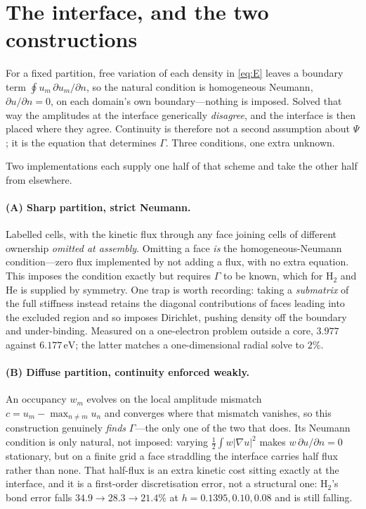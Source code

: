 \documentclass[11pt,a4paper]{article}
\begin{document}
\section{The interface, and the two constructions}

For a fixed partition, free variation of each density in \eqref{eq:E} leaves a boundary term
$\oint u_m \,\partial u_m/\partial n$, so the natural condition is homogeneous Neumann,
$\partial u/\partial n = 0$, on each domain's own boundary---nothing is imposed. Solved that way the
amplitudes at the interface generically \emph{disagree}, and the interface is then placed where they
agree. Continuity is therefore not a second assumption about $\Psi$; it is the equation that
determines $\Gamma$. Three conditions, one extra unknown.

Two implementations each supply one half of that scheme and take the other half from elsewhere.

\paragraph{(A) Sharp partition, strict Neumann.} Labelled cells, with the kinetic flux through any
face joining cells of different ownership \emph{omitted at assembly}. Omitting a face \emph{is} the
homogeneous-Neumann condition---zero flux implemented by not adding a flux, with no extra equation.
This imposes the condition exactly but requires $\Gamma$ to be known, which for H$_2$ and He is
supplied by symmetry. One trap is worth recording: taking a \emph{submatrix} of the full stiffness
instead retains the diagonal contributions of faces leading into the excluded region and so imposes
Dirichlet, pushing density off the boundary and under-binding. Measured on a one-electron problem
outside a core, $3.977$ against $6.177\,\mathrm{eV}$; the latter matches a one-dimensional radial
solve to $2\%$.

\paragraph{(B) Diffuse partition, continuity enforced weakly.} An occupancy $w_m$ evolves on the
local amplitude mismatch $c = u_m - \max_{n\neq m} u_n$ and converges where that mismatch vanishes,
so this construction genuinely \emph{finds} $\Gamma$---the only one of the two that does. Its
Neumann condition is only natural, not imposed: varying $\tfrac12\int w|\nabla u|^2$ makes
$w\,\partial u/\partial n = 0$ stationary, but on a finite grid a face straddling the interface
carries half flux rather than none. That half-flux is an extra kinetic cost sitting exactly at the
interface, and it is a first-order discretisation error, not a structural one: H$_2$'s bond error
falls $34.9 \to 28.3 \to 21.4\%$ at $h = 0.1395, 0.10, 0.08$ and is still falling.
\end{document}
